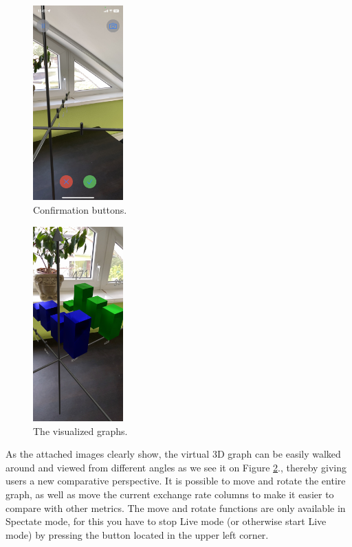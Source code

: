 \documentclass[a4paper,oneside]{article}
\begin{document}
\begin{figure}[!ht]
  \centering
  \includegraphics[height=75mm, keepaspectratio]{../images/megerosites.jpeg}
  \caption{Confirmation buttons.}
  \label{fig:megerosites}
\end{figure}


\begin{figure}[!ht]
  \centering
  \includegraphics[height=75mm, keepaspectratio]{../images/top.jpeg}
  \caption{The visualized graphs.}
  \label{fig:top}
\end{figure}

As the attached images clearly show, the virtual 3D graph can be easily walked around and viewed from different angles as we see it on Figure \ref{fig:top}., thereby giving users a new comparative perspective. It is possible to move and rotate the entire graph, as well as move the current exchange rate columns to make it easier to compare with other metrics. The move and rotate functions are only available in Spectate mode, for this you have to stop Live mode (or otherwise start Live mode) by pressing the button located in the upper left corner.
\end{document}
